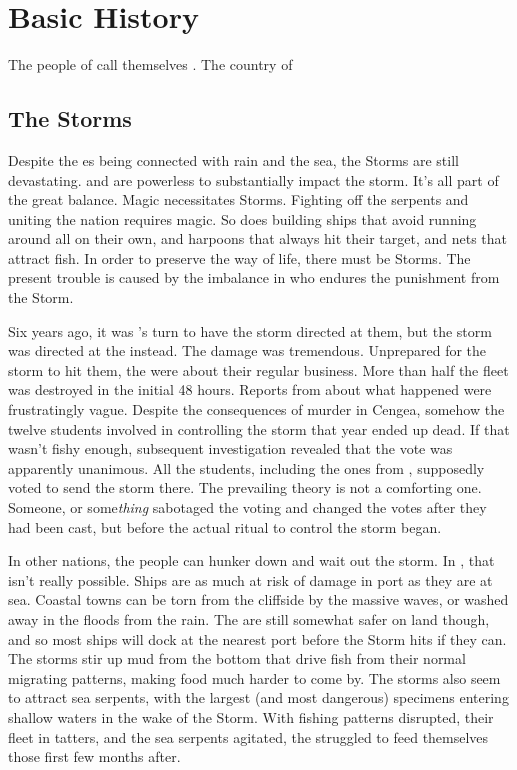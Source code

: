 \documentclass[blue]{GL2020}
\begin{document}
\name{\bVikings{}}

\section*{Basic History}
The people of \pShip{} call themselves \pShippies{}. The country of \pShip{}

\subsection*{The Storms}
Despite the \pShip{} \cEbb{\God}es being connected with rain and the sea, the Storms are still devastating. \cEbb{} and \cFlow{} are powerless to substantially impact the storm. It's all part of the great balance. Magic necessitates Storms. Fighting off the serpents and uniting the \pShip{} nation requires magic. So does building ships that avoid running around all on their own, and harpoons that always hit their target, and nets that attract fish. In order to preserve the \pShip{} way of life, there must be Storms. The present trouble is caused by the imbalance in who endures the punishment from the Storm.

Six years ago, it was \pTech{}'s turn to have the storm directed at them, but the storm was directed at the \pShip{} instead. The damage was tremendous. Unprepared for the storm to hit them, the \pShippies{} were about their regular business. More than half the fleet was destroyed in the initial 48 hours. Reports from \pSchool{} about what happened were frustratingly vague. Despite the consequences of murder in Cengea, somehow the twelve students involved in controlling the storm that year ended up dead. If that wasn't fishy enough, subsequent investigation revealed that the vote was apparently unanimous. All the students, including the ones from \pShip{}, supposedly voted to send the storm there. The prevailing theory is not a comforting one. Someone, or some\emph{thing} sabotaged the voting and changed the votes after they had been cast, but before the actual ritual to control the storm began.


In other nations, the people can hunker down and wait out the storm. In \pShip{}, that isn't really possible. Ships are as much at risk of damage in port as they are at sea. Coastal towns can be torn from the cliffside by the massive waves, or washed away in the floods from the rain. The \pShippies{} are still somewhat safer on land though, and so most ships will dock at the nearest port before the Storm hits if they can. The storms stir up mud from the bottom that drive fish from their normal migrating patterns, making food much harder to come by. The storms also seem to attract sea serpents, with the largest (and most dangerous) specimens entering shallow waters in the wake of the Storm. With fishing patterns disrupted, their fleet in tatters, and the sea serpents agitated, the \pShip{} struggled to feed themselves those first few months after.
\end{document}
